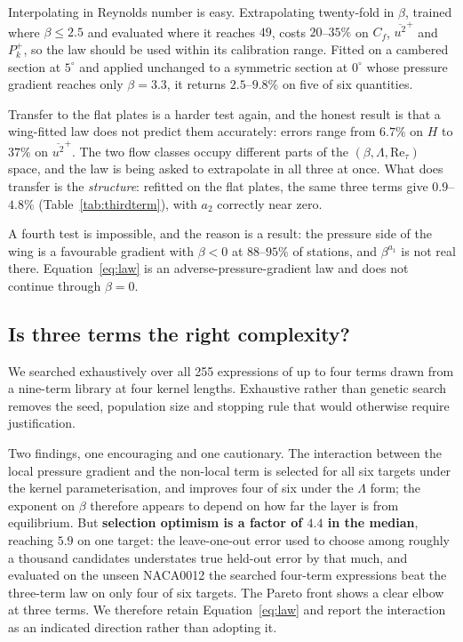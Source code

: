 \documentclass[11pt,a4paper]{article}
\newcommand{\Ret}{\mathrm{Re}_\tau}
\begin{document}
Interpolating in Reynolds number is easy. Extrapolating twenty-fold in
$\beta$, trained where $\beta \le 2.5$ and evaluated where it reaches
$49$, costs $20$--$35\%$ on $C_f$, $\overline{u^2}^+$ and $P_k^+$, so the
law should be used within its calibration range. Fitted on a cambered
section at $5^\circ$ and applied unchanged to a symmetric section at
$0^\circ$ whose pressure gradient reaches only $\beta = 3.3$, it returns
$2.5$--$9.8\%$ on five of six quantities.

Transfer to the flat plates is a harder test again, and the honest result is
that a wing-fitted law does not predict them accurately: errors range from
$6.7\%$ on $H$ to $37\%$ on $\overline{u^2}^+$. The two flow classes occupy
different parts of the $(\beta, \Lambda, \Ret)$ space, and the law is being
asked to extrapolate in all three at once. What does transfer is the
\emph{structure}: refitted on the flat plates, the same three terms give
$0.9$--$4.8\%$ (Table~\ref{tab:thirdterm}), with $a_2$ correctly near zero.

A fourth test is impossible, and the reason is a result: the pressure side
of the wing is a favourable gradient with $\beta < 0$ at $88$--$95\%$ of
stations, and $\beta^{a_1}$ is not real there. Equation~\eqref{eq:law} is an
adverse-pressure-gradient law and does not continue through $\beta = 0$.

\subsection{Is three terms the right complexity?}

We searched exhaustively over all 255 expressions of up to four terms drawn
from a nine-term library at four kernel lengths. Exhaustive rather than
genetic search removes the seed, population size and stopping rule that
would otherwise require justification.

Two findings, one encouraging and one cautionary. The interaction between
the local pressure gradient and the non-local term is selected for all six
targets under the kernel parameterisation, and improves four of six under
the $\Lambda$ form; the exponent on $\beta$ therefore appears to depend on
how far the layer is from equilibrium. But \textbf{selection optimism is a
factor of $4.4$ in the median}, reaching $5.9$ on one target: the
leave-one-out error used to choose among roughly a thousand candidates
understates true held-out error by that much, and evaluated on the unseen NACA0012 the searched
four-term expressions beat the three-term law on only four of six targets.
The Pareto front shows a clear elbow at three terms. We therefore retain
Equation~\eqref{eq:law} and report the interaction as an indicated direction
rather than adopting it.
\end{document}

